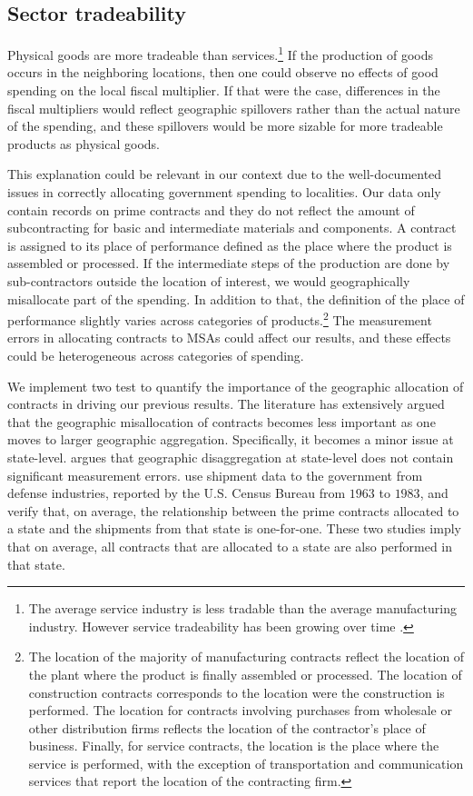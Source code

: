\documentclass[dv_diss_main.tex]{subfiles}
\begin{document}
\subsection{Sector tradeability}\label{subsec:outflow}

Physical goods are more tradeable than services.\footnote{The average service industry is less tradable than the
average manufacturing industry. However service tradeability has been growing over time \citep{gervais2019tradability}.} If the production of goods occurs in the neighboring locations, then one could observe no effects of good spending on the local fiscal multiplier. If that were the case, differences in the fiscal multipliers would reflect geographic spillovers rather than the actual nature of the spending, and these spillovers would be more sizable for more tradeable products as physical goods.

This explanation could be relevant in our context due to the well-documented issues in correctly allocating government spending to localities. Our data only contain records on prime contracts and they do not reflect the amount of subcontracting for basic and intermediate materials and components. A contract is assigned to its place of performance defined as the place where the product is assembled or processed. If the intermediate steps of the production  are done by sub-contractors outside the location of interest, we would geographically misallocate part of the spending. In addition to that, the definition of the place of performance slightly varies across categories of products.\footnote{The location of the majority of manufacturing contracts reflect the location of the plant where the product is finally assembled or processed. The location of construction contracts corresponds to the location were the construction is performed. The location for contracts involving purchases from wholesale or other distribution firms reflects the location of the contractor's place of business. Finally, for service contracts, the location is the place where the service is performed, with the exception of transportation and communication services that report the location of the contracting firm.} The measurement errors in allocating contracts to MSAs could affect our results, and these effects could be heterogeneous across categories of spending.

We implement two test to quantify the importance of the geographic allocation of contracts in driving our previous results. The literature has extensively argued that the geographic misallocation of contracts becomes less important as one moves to larger geographic aggregation. Specifically, it becomes a minor issue at state-level. \cite{Isard1962} argues that geographic disaggregation at state-level does not contain significant measurement errors. \cite{Nakamura2014} use shipment data to the government from defense industries, reported by the U.S. Census Bureau from $1963$ to $1983$, and verify that, on average, the relationship between the prime contracts allocated to a state and the shipments from that state is one-for-one. These two studies imply that on average, all contracts that are allocated to a state are also performed in that state.
\end{document}
